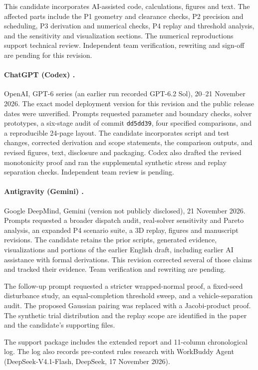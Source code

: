 This candidate incorporates AI-assisted code, calculations, figures and text. The affected parts include the P1 geometry and clearance checks, P2 precision and scheduling, P3 derivation and numerical checks, P4 replay and threshold analysis, and the sensitivity and visualization sections. The numerical reproductions support technical review. Independent team verification, rewriting and sign-off are pending for this revision.

\paragraph{ChatGPT (Codex) \cite{archivedai}.}
OpenAI, GPT-6 series (an earlier run recorded GPT-6.2 Sol), 20--21 November 2026. The exact model deployment version for this revision and the public release dates were unverified.
Prompts requested parameter and boundary checks, solver prototypes, a six-stage audit of commit \texttt{dd5dd39}, four specified comparisons, and a reproducible 24-page layout.
The candidate incorporates script and test changes, corrected derivation and scope statements, the comparison outputs, and revised figures, text, disclosure and packaging. Codex also drafted the revised monotonicity proof and ran the supplemental synthetic stress and replay separation checks. Independent team review is pending.

\paragraph{Antigravity (Gemini) \cite{antigravityai}.}
Google DeepMind, Gemini (version not publicly disclosed), 21 November 2026.
Prompts requested a broader dispatch audit, real-solver sensitivity and Pareto analysis, an expanded P4 scenario suite, a 3D replay, figures and manuscript revisions.
The candidate retains the prior scripts, generated evidence, visualizations and portions of the earlier English draft, including earlier AI assistance with formal derivations. This revision corrected several of those claims and tracked their evidence. Team verification and rewriting are pending.

The follow-up prompt requested a stricter wrapped-normal proof, a fixed-seed disturbance study, an equal-completion threshold sweep, and a vehicle-separation audit. The proposed Gaussian pairing was replaced with a Jacobi-product proof. The synthetic trial distribution and the replay scope are identified in the paper and the candidate's supporting files.

The support package includes the extended report and 11-column chronological log.
The log also records pre-contest rules research with WorkBuddy Agent (DeepSeek-V4.1-Flash, DeepSeek, 17 November 2026).
